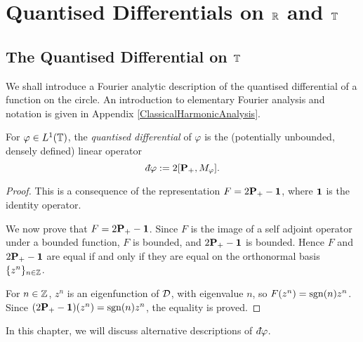 
\chapter{Quantised Differentials on $\mathbb{R}$ and $\mathbb{T}$} %

\label{QuantisedDifferentialsOnRandT} %



\section{The Quantised Differential on $\mathbb{T}$}
We shall introduce a Fourier analytic description of the quantised differential
of a function on the circle. An introduction to elementary Fourier analysis and
notation is given in Appendix \ref{ClassicalHarmonicAnalysis}.

\begin{proposition}
    For $\varphi \in L^1(\mathbb{T})$, the \emph{quantised differential} of $\varphi$ is the (potentially unbounded, densely defined) linear operator
    \begin{equation*}
        \qd\varphi := 2[\Proj_+,M_\varphi].
    \end{equation*}
\end{proposition}
\begin{proof}
    This is a consequence of the representation $F = 2\mathbf{P}_+-\mathbf{1}$,
    where $\mathbf{1}$ is the identity operator.
    
    We now prove that $F = 2\mathbf{P}_+-\mathbf{1}$. Since $F$ is the image
    of a self adjoint operator under a bounded function, $F$ is bounded,
    and $2\mathbf{P}_+-\mathbf{1}$ is bounded. Hence $F$ and $2\mathbf{P}_+-\mathbf{1}$
    are equal if and only if they are equal on the orthonormal basis $\{z^n\}_{n\in\mathbb{Z}}$. 
    
    For $n \in \mathbb{Z}$, $z^n$ is an eigenfunction of $\mathcal{D}$, with eigenvalue
    $n$, so $F(z^n) = \operatorname{sgn}(n)z^n$. Since $(2\mathbf{P}_+-\mathbf{1})(z^n) = \operatorname{sgn}(n)z^n$,
    the equality is proved.
\end{proof}
In this chapter, we will discuss alternative descriptions of $\qd \varphi$.


